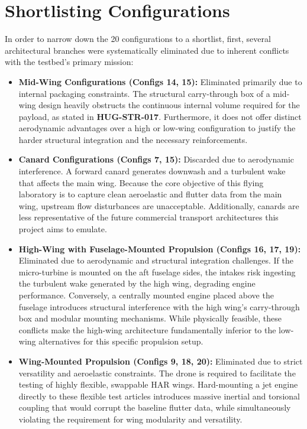 \section{Shortlisting Configurations}
In order to narrow down the 20 configurations to a shortlist, first, several architectural branches were systematically eliminated due to inherent conflicts with the testbed's primary mission:

\begin{itemize}
    \item \textbf{Mid-Wing Configurations (Configs 14, 15):} Eliminated primarily due to internal packaging constraints. The structural carry-through box of a mid-wing design heavily obstructs the continuous internal volume required for the payload, as stated in  \textbf{HUG-STR-017}. Furthermore, it does not offer distinct aerodynamic advantages over a high or low-wing configuration to justify the harder structural integration and the necessary reinforcements.\cite{} 
    
    \item \textbf{Canard Configurations (Configs 7, 15):} Discarded due to aerodynamic interference. A forward canard generates downwash and a turbulent wake that affects the main wing. Because the core objective of this flying laboratory is to capture clean aeroelastic and flutter data from the main wing, upstream flow disturbances are unacceptable. Additionally, canards are less representative of the future commercial transport architectures this project aims to emulate.
    
    \item \textbf{High-Wing with Fuselage-Mounted Propulsion (Configs 16, 17, 19):} Eliminated due to aerodynamic and structural integration challenges. If the micro-turbine is mounted on the aft fuselage sides, the intakes risk ingesting the turbulent wake generated by the high wing, degrading engine performance. Conversely, a centrally mounted engine placed above the fuselage introduces structural interference with the high wing's carry-through box and modular mounting mechanisms. While physically feasible, these conflicts make the high-wing architecture fundamentally inferior to the low-wing alternatives for this specific propulsion setup.
    
    \item \textbf{Wing-Mounted Propulsion (Configs 9, 18, 20):} Eliminated due to strict versatility and aeroelastic constraints. The drone is required to facilitate the testing of highly flexible, swappable HAR wings. Hard-mounting a jet engine directly to these flexible test articles introduces massive inertial and torsional coupling that would corrupt the baseline flutter data, while simultaneously violating the requirement for wing modularity and versatility.
\end{itemize}



